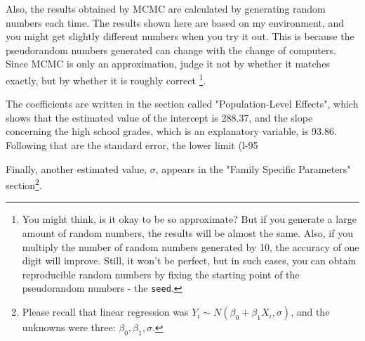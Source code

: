 \documentclass{ltjsarticle}
\begin{document}
Also, the results obtained by MCMC are calculated by generating random numbers each time. The results shown here are based on my environment, and you might get slightly different numbers when you try it out. This is because the pseudorandom numbers generated can change with the change of computers. Since MCMC is only an approximation, judge it not by whether it matches exactly, but by whether it is roughly correct \footnote{You might think, is it okay to be so approximate? But if you generate a large amount of random numbers, the results will be almost the same. Also, if you multiply the number of random numbers generated by 10, the accuracy of one digit will improve. Still, it won't be perfect, but in such cases, you can obtain reproducible random numbers by fixing the starting point of the pseudorandom numbers - the \texttt{seed}.}.

The coefficients are written in the section called "Population-Level Effects", which shows that the estimated value of the intercept is 288.37, and the slope concerning the high school grades, which is an explanatory variable, is 93.86. Following that are the standard error, the lower limit (l-95%

Finally, another estimated value, $\sigma$, appears in the "Family Specific Parameters" section\footnote{Please recall that linear regression was $Y_i \sim N(\beta_0 + \beta_1 X_i , \sigma)$, and the unknowns were three: $\beta_0,\beta_1,\sigma$.}.
\end{document}
